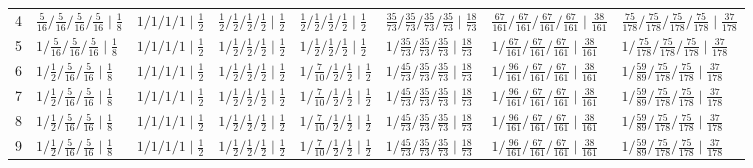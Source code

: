 \documentclass[11pt,a4paper]{article}
\theoremstyle{plain}
\theoremstyle{definition}
\theoremstyle{remark}
\begin{document}
\begin{table}[H]
{\begin{tabular}{rlllllll}
4 & $\tfrac{5}{16}/\tfrac{5}{16}/\tfrac{5}{16}/\tfrac{5}{16} \mid \tfrac{1}{8}$ & $1/1/1/1 \mid \tfrac{1}{2}$ & $\tfrac{1}{2}/\tfrac{1}{2}/\tfrac{1}{2}/\tfrac{1}{2} \mid \tfrac{1}{2}$ & $\tfrac{1}{2}/\tfrac{1}{2}/\tfrac{1}{2}/\tfrac{1}{2} \mid \tfrac{1}{2}$ & $\tfrac{35}{73}/\tfrac{35}{73}/\tfrac{35}{73}/\tfrac{35}{73} \mid \tfrac{18}{73}$ & $\tfrac{67}{161}/\tfrac{67}{161}/\tfrac{67}{161}/\tfrac{67}{161} \mid \tfrac{38}{161}$ & $\tfrac{75}{178}/\tfrac{75}{178}/\tfrac{75}{178}/\tfrac{75}{178} \mid \tfrac{37}{178}$\\
5 & $1/\tfrac{5}{16}/\tfrac{5}{16}/\tfrac{5}{16} \mid \tfrac{1}{8}$ & $1/1/1/1 \mid \tfrac{1}{2}$ & $1/\tfrac{1}{2}/\tfrac{1}{2}/\tfrac{1}{2} \mid \tfrac{1}{2}$ & $1/\tfrac{1}{2}/\tfrac{1}{2}/\tfrac{1}{2} \mid \tfrac{1}{2}$ & $1/\tfrac{35}{73}/\tfrac{35}{73}/\tfrac{35}{73} \mid \tfrac{18}{73}$ & $1/\tfrac{67}{161}/\tfrac{67}{161}/\tfrac{67}{161} \mid \tfrac{38}{161}$ & $1/\tfrac{75}{178}/\tfrac{75}{178}/\tfrac{75}{178} \mid \tfrac{37}{178}$\\
6 & $1/\tfrac{1}{2}/\tfrac{5}{16}/\tfrac{5}{16} \mid \tfrac{1}{8}$ & $1/1/1/1 \mid \tfrac{1}{2}$ & $1/\tfrac{1}{2}/\tfrac{1}{2}/\tfrac{1}{2} \mid \tfrac{1}{2}$ & $1/\tfrac{7}{10}/\tfrac{1}{2}/\tfrac{1}{2} \mid \tfrac{1}{2}$ & $1/\tfrac{45}{73}/\tfrac{35}{73}/\tfrac{35}{73} \mid \tfrac{18}{73}$ & $1/\tfrac{96}{161}/\tfrac{67}{161}/\tfrac{67}{161} \mid \tfrac{38}{161}$ & $1/\tfrac{59}{89}/\tfrac{75}{178}/\tfrac{75}{178} \mid \tfrac{37}{178}$\\
7 & $1/\tfrac{1}{2}/\tfrac{5}{16}/\tfrac{5}{16} \mid \tfrac{1}{8}$ & $1/1/1/1 \mid \tfrac{1}{2}$ & $1/\tfrac{1}{2}/\tfrac{1}{2}/\tfrac{1}{2} \mid \tfrac{1}{2}$ & $1/\tfrac{7}{10}/\tfrac{1}{2}/\tfrac{1}{2} \mid \tfrac{1}{2}$ & $1/\tfrac{45}{73}/\tfrac{35}{73}/\tfrac{35}{73} \mid \tfrac{18}{73}$ & $1/\tfrac{96}{161}/\tfrac{67}{161}/\tfrac{67}{161} \mid \tfrac{38}{161}$ & $1/\tfrac{59}{89}/\tfrac{75}{178}/\tfrac{75}{178} \mid \tfrac{37}{178}$\\
8 & $1/\tfrac{1}{2}/\tfrac{5}{16}/\tfrac{5}{16} \mid \tfrac{1}{8}$ & $1/1/1/1 \mid \tfrac{1}{2}$ & $1/\tfrac{1}{2}/\tfrac{1}{2}/\tfrac{1}{2} \mid \tfrac{1}{2}$ & $1/\tfrac{7}{10}/\tfrac{1}{2}/\tfrac{1}{2} \mid \tfrac{1}{2}$ & $1/\tfrac{45}{73}/\tfrac{35}{73}/\tfrac{35}{73} \mid \tfrac{18}{73}$ & $1/\tfrac{96}{161}/\tfrac{67}{161}/\tfrac{67}{161} \mid \tfrac{38}{161}$ & $1/\tfrac{59}{89}/\tfrac{75}{178}/\tfrac{75}{178} \mid \tfrac{37}{178}$\\
9 & $1/\tfrac{1}{2}/\tfrac{5}{16}/\tfrac{5}{16} \mid \tfrac{1}{8}$ & $1/1/1/1 \mid \tfrac{1}{2}$ & $1/\tfrac{1}{2}/\tfrac{1}{2}/\tfrac{1}{2} \mid \tfrac{1}{2}$ & $1/\tfrac{7}{10}/\tfrac{1}{2}/\tfrac{1}{2} \mid \tfrac{1}{2}$ & $1/\tfrac{45}{73}/\tfrac{35}{73}/\tfrac{35}{73} \mid \tfrac{18}{73}$ & $1/\tfrac{96}{161}/\tfrac{67}{161}/\tfrac{67}{161} \mid \tfrac{38}{161}$ & $1/\tfrac{59}{89}/\tfrac{75}{178}/\tfrac{75}{178} \mid \tfrac{37}{178}$\\

\end{tabular}}
\end{table}
\end{document}
